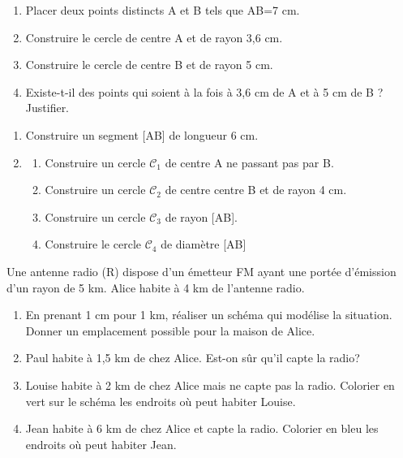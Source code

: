 \documentclass[a4paper]{book}
\begin{document}
     \begin{exercice}
        \begin{enumerate}
            \item Placer deux points distincts A et B tels que AB=7 cm.
            \item Construire le cercle de centre A et de rayon 3,6 cm.
            \item Construire le cercle de centre B et de rayon 5 cm. 
            \item Existe-t-il des points qui soient à la fois à 3,6 cm de A et à 5 cm de B ? Justifier.
         \end{enumerate}
     \end{exercice}


    \begin{exercice}
        \begin{enumerate}
            \item Construire un segment [AB] de longueur 6 cm.
            \item \begin{enumerate}
                \item Construire un cercle $\mathcal{C}_1$ de centre A ne passant pas par B.
                \item Construire un cercle $\mathcal{C}_2$ de centre centre B et de rayon 4 cm.
                \item Construire un cercle $\mathcal{C}_3$ de rayon [AB].
                \item Construire le cercle $\mathcal{C}_4$ de diamètre [AB]
            \end{enumerate}
        \end{enumerate}    
    \end{exercice}


    \begin{exercice}        
        Une antenne radio (R) dispose d'un émetteur FM ayant une portée d'émission d'un rayon de 5 km. Alice habite à 4 km de l'antenne radio.
        \begin{enumerate}    
            \item En prenant 1 cm pour 1 km, réaliser un schéma qui modélise la situation. Donner un emplacement possible pour la maison de Alice.
            
            \item Paul habite à 1,5 km de chez Alice. Est-on sûr qu'il capte la radio?

            \item Louise habite à 2 km de chez Alice mais ne capte pas la radio. Colorier en vert  sur le schéma les endroits où peut habiter Louise.

            \item Jean  habite à 6 km de chez Alice et capte la radio. Colorier en bleu les endroits où peut habiter Jean.
        \end{enumerate}
    \end{exercice}
    
\end{document}
